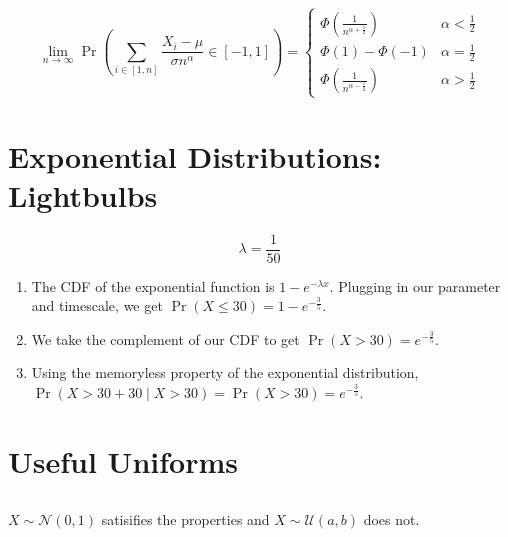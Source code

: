 \documentclass{article}
\begin{document}
\subsection{}

\begin{equation}
    \lim_{n \to \infty} \Pr\left(\sum_{i \in [1, n]} \frac{X_i - \mu}{\sigma n^\alpha} \in [-1, 1]\right) =
    \begin{cases}
        \Phi\left(\frac{1}{n^{\alpha + \frac{1}{2}}}\right) & \alpha < \frac{1}{2} \\
        \Phi(1) - \Phi(-1) & \alpha = \frac{1}{2} \\
        \Phi\left(\frac{1}{n^{\alpha - \frac{1}{2}}}\right) & \alpha > \frac{1}{2}
    \end{cases}
\end{equation}

\newpage
\section{Exponential Distributions: Lightbulbs}

\begin{equation}
    \lambda = \frac{1}{50}
\end{equation}

\begin{enumerate}
    \item The CDF of the exponential function is \(1 - e^{-\lambda x}\).
    Plugging in our parameter and timescale, we get \(\Pr(X \leqslant 30) = 1 - e^{-\frac{3}{5}}\).
    \item We take the complement of our CDF to get \(\Pr(X > 30) = e^{-\frac{3}{5}}\).
    \item Using the memoryless property of the exponential distribution,
    \(\Pr(X > 30 + 30 \mid X > 30) = \Pr(X > 30) = e^{-\frac{3}{5}}\).
\end{enumerate}

\section{Useful Uniforms}

\subsection{}

\(X \sim \mathcal{N}(0, 1)\) satisifies the properties and  \(X \sim \mathcal{U}(a, b)\) does not.
\end{document}
